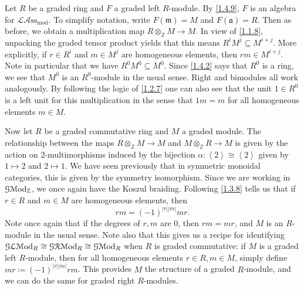 \begin{discussion}\label{1.4.11}
	Let $R$ be a graded ring and $F$ a graded left $R$-module. By \cref{1.4.9}, $F$ is an algebra for $\mathcal{L} \mathcal{A}\mathrm{ss}_{\mathrm{mod} } $. To simplify notation, write $F(\mathfrak{m} )=M$ and $F(\mathfrak{a} )=R$. Then as before, we obtain a multiplication map $R\otimes_\mathbb{Z} M \to M$. In view of \cref{1.1.8}, unpacking the graded tensor product yields that this means $R^iM^j \subseteq M^{i+j} $. More explicitly, if $r\in R^i$ and $m\in M^j$ are homogeneous elements, then $r m\in M^{i+j} $. Note in particular that we have $R^0M^0\subseteq M^0$. Since \cref{1.4.2} says that $R^0$ is a ring, we see that $M^0$ is an $R^0$-module in the usual sense. Right and bimodules all work analogously. By following the logic of \cref{1.2.7} one can also see that the unit $1\in R^0$ is a left unit for this multiplication in the sense that $1m=m$ for all homogeneous elements $m\in M$.

	Now let $R$ be a graded commutative ring and $M$ a graded module. The relationship between the maps $R\otimes_\mathbb{Z}  M\to M$ and $M\otimes _\mathbb{Z} R\to M$ is given by the action on 2-multimorphisms induced by the bijection $\alpha : \left\langle 2 \right\rangle \cong \left\langle 2 \right\rangle $ given by $1\mapsto 2$ and $2\mapsto 1$. We have seen previously that in symmetric monoidal categories, this is given by the symmetry isomorphism. Since we are working in $\mathcal{G} \mathcal{M}\mathrm{od} _\mathbb{Z} $, we once again have the Koszul braiding. Following \cref{1.3.8} tells us that if $r\in R$ and $m\in M$ are homogeneous elements, then
	\[
		r m = (-1)^{\left| r \right| \left| m \right| } m r
	.\]
	Note once again that if the degrees of $r,m$ are 0, then $r m=mr$, and $M$ is an $R$-module in the usual sense. Note also that this gives us a recipe for identifying $\mathcal{G}\mathcal{L} \mathcal{M}\mathrm{od} _R \cong \mathcal{G} \mathcal{R} \mathcal{M}\mathrm{od} _R \cong \mathcal{G} \mathcal{M}\mathrm{od} _R$ when $R$ is graded commutative: if $M$ is a graded left $R$-module, then for all homogeneous elements $r\in R,m\in M$, simply define $mr \coloneqq (-1)^{\left| r \right| \left| m \right| } rm$. This provides $M$ the structure of a graded $R$-module, and we can do the same for graded right $R$-modules.


\end{discussion}
